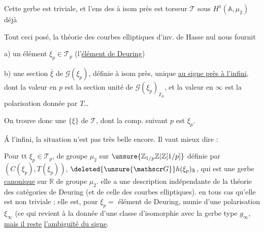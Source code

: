 Cette gerbe est  triviale, et l'ens des  à isom
 près est  torseur $\mathcal T$ sous $H^1(\mathbb A,\mu_2)$ déjà


Tout ceci posé, la théorie  des courbes elliptiques
d'inv. de Hasse nul nous fournit

a) un élément $\xi_p\in\mathcal T_p$ (l'\uline{élément de Deuring})

b) une section  $\bar\xi$ de $\mathscr G(\xi_p)$, définie
à isom près, unique \uline{au signe près à l'infini},
dont la valeur en $p$  est la section unité
 de $\mathscr G(\xi_p)_{\mathbb Z_p}$, et la valeur en $\infty$ est la
polarisation donnée par $T$\ldots

On trouve donc une  $\{\xi\}$ de $\mathcal T$, dont la
comp. suivant $p$ est $\xi_p$.


Á l'infini, la situation n'est pas très belle encore. Il
vaut mieux dire :

Pour tt $\xi_p\in\mathcal T_p$,   de
groupe $\mu_2$ sur $\unsure{\mathbb Z_{1/p}\mathbb Z|\mathbb Z[1/p]}$ définie par $(C(\xi_p),T(\xi_p))$,  
$\deleted{\unsure{\mathscr G}} h(\xi_p)_{\mathbb R}$, qui est une gerbe \uline{canonique} sur $\mathbb R$ de groupe
$\mu_2$.   elle a une description indépendante
de la théorie des catégories de Deuring (et de celle
des courbes elliptiques).   en tous cas
qu'elle est non triviale ; elle est, pour $\xi_p=$ élément de Deuring,
munie d'une polarisation $\xi_\infty$ (ce qui revient à la
donnée d'une classe d'isomorphie  avec la gerbe
type $g_\infty$, \uline{mais il reste} \uline{l'ambiguïté du signe}.

